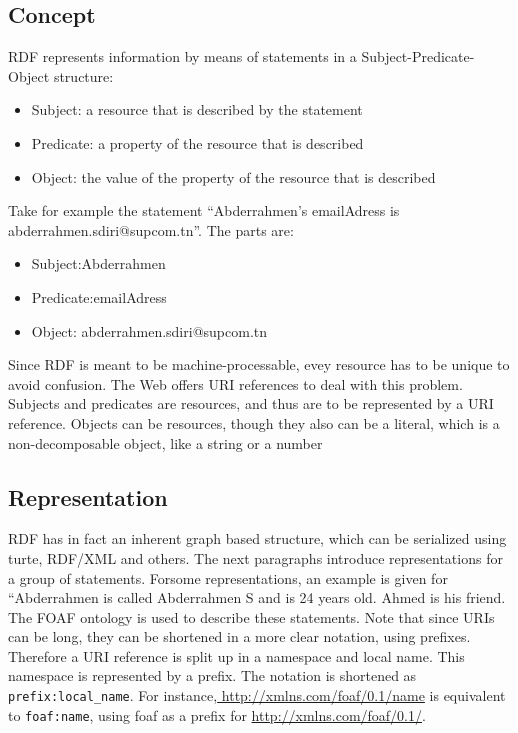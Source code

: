 \documentclass[a4paper,12pt,oneside]{report}
\begin{document}
{\subsection{Concept}
{RDF represents information by means of statements in a Subject-Predicate-Object structure:
\begin{itemize}
\item {Subject: a resource that is described by the statement}
\item {Predicate: a property of the resource that is described}
\item {Object: the value of the property of the resource that is described}
\end{itemize} 
{Take for example the statement “Abderrahmen's emailAdress is abderrahmen.sdiri@supcom.tn”. The parts are:
\begin{itemize}
\item {Subject:Abderrahmen }
\item {Predicate:emailAdress}
\item {Object: abderrahmen.sdiri@supcom.tn}
\end{itemize}
{Since RDF is meant to be machine-processable, evey resource has to be unique to avoid confusion. The Web offers URI references to deal with this problem. Subjects and predicates are resources, and thus are to be represented by a URI reference. Objects can be resources, though they also can be a literal, which is a non-decomposable object, like a string or a number}
\subsection{Representation}
{RDF has in fact an inherent graph based structure, which can be serialized using turte, RDF/XML and others. The next paragraphs introduce representations for a group of statements. Forsome representations, an example is given for “Abderrahmen is called Abderrahmen S and is 24 years old. Ahmed is his friend. The FOAF  ontology is used to describe these statements. Note that since URIs can be long, they can be shortened in a more clear notation, using prefixes. Therefore a URI reference is split up in a namespace and local name.
This namespace is represented by a prefix. The notation is shortened as  \verb!prefix:local_name!. For instance,\url{ http://xmlns.com/foaf/0.1/name}  is  equivalent to \verb!foaf:name!, using foaf as a prefix for  \url{http://xmlns.com/foaf/0.1/}.}
}}}
\end{document}
